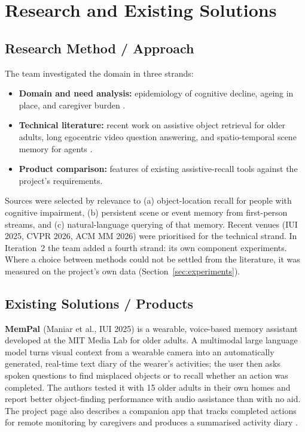 \chapter{Research and Existing Solutions}
\label{chap:research}

\section{Research Method / Approach}
The team investigated the domain in three strands:
\begin{itemize}
\item \textbf{Domain and need analysis:} epidemiology of cognitive decline,
ageing in place, and caregiver burden
\cite{who2024,statista2022,alz2023,mogle2023,marchant2011,kasper2015,harris2006,arno1999}.
\item \textbf{Technical literature:} recent work on assistive object retrieval
for older adults, long egocentric video question answering, and spatio-temporal
scene memory for agents
\cite{daaam2026,mempal2025,r4dsg2026,spatialmem2026,supermemory2026}.
\item \textbf{Product comparison:} features of existing assistive-recall tools
against the project's requirements.
\end{itemize}
Sources were selected by relevance to (a) object-location recall for people
with cognitive impairment, (b) persistent scene or event memory from
first-person streams, and (c) natural-language querying of that memory. Recent
venues (IUI 2025, CVPR 2026, ACM MM 2026) were prioritised for the technical
strand. In Iteration~2 the team added a fourth strand: its own component
experiments. Where a choice between methods could not be settled from the
literature, it was measured on the project's own data
(Section~\ref{sec:experiments}).

\section{Existing Solutions / Products}
\textbf{MemPal \cite{mempal2025}} (Maniar et al., IUI 2025) is a wearable,
voice-based memory assistant developed at the MIT Media Lab for older adults.
A multimodal large language model turns visual context from a wearable camera
into an automatically generated, real-time text diary of the wearer's
activities; the user then asks spoken questions to find misplaced objects or to
recall whether an action was completed. The authors tested it with 15 older
adults in their own homes and report better object-finding performance with
audio assistance than with no aid. The project page also describes a companion
app that tracks completed actions for remote monitoring by caregivers and
produces a summarised activity diary \cite{mempalpage}.

